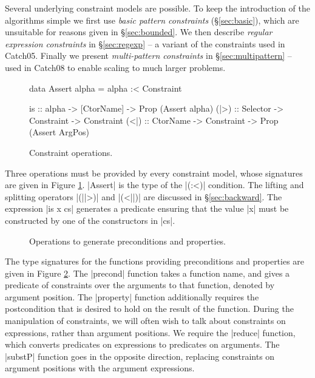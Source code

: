 \documentclass[preprint]{sigplanconf}
\begin{document}
Several underlying constraint models are possible. To keep the introduction of the algorithms simple we first use \textit{basic pattern constraints} (\S\ref{sec:basic}), which are unsuitable for reasons given in \S\ref{sec:bounded}. We then describe \textit{regular expression constraints} in \S\ref{sec:regexp} -- a variant of the constraints used in Catch05. Finally we present \textit{multi-pattern constraints} in \S\ref{sec:multipattern} -- used in Catch08 to enable scaling to much larger problems.

\begin{figure}
\begin{code}
data Assert alpha = alpha :< Constraint

is    :: alpha -> [CtorName] -> Prop (Assert alpha)
(|>)  :: Selector -> Constraint -> Constraint
(<|)  :: CtorName -> Constraint -> Prop (Assert ArgPos)
\end{code}
\caption{Constraint operations.}
\label{fig:constraint}
\end{figure}

Three operations must be provided by every constraint model, whose signatures are given in Figure \ref{fig:constraint}. |Assert| is the type of the |(:<)| condition. The lifting and splitting operators |(||>)| and |(<||)| are discussed in \S\ref{sec:backward}. The expression |is x cs| generates a predicate ensuring that the value |x| must be constructed by one of the constructors in |cs|.

\begin{figure}
\caption{Operations to generate preconditions and properties.}
\label{fig:operations}
\end{figure}

The type signatures for the functions providing preconditions and properties are given in Figure \ref{fig:operations}. The |precond| function takes a function name, and gives a predicate of constraints over the arguments to that function, denoted by argument position. The |property| function additionally requires the postcondition that is desired to hold on the result of the function. During the manipulation of constraints, we will often wish to talk about constraints on expressions, rather than argument positions. We require the |reduce| function, which converts predicates on expressions to predicates on arguments. The |substP| function goes in the opposite direction, replacing constraints on argument positions with the argument expressions.
\end{document}
